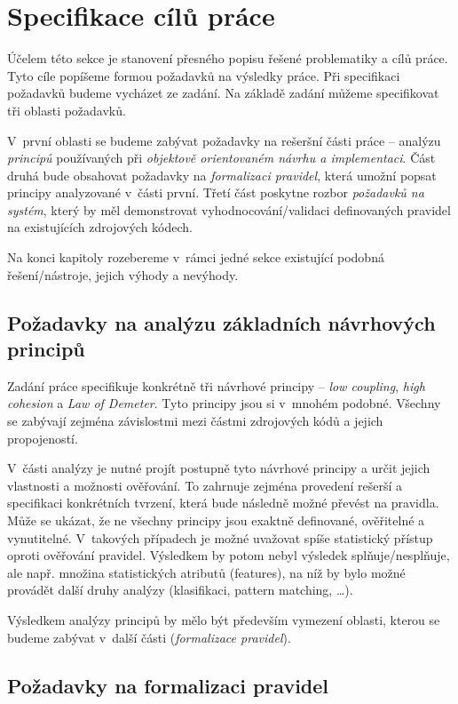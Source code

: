 \chapter{Specifikace cílů práce}

Účelem této sekce je stanovení přesného popisu řešené problematiky a cílů práce. Tyto cíle popíšeme formou požadavků na výsledky práce. Při specifikaci požadavků budeme vycházet ze zadání. Na základě zadání můžeme specifikovat tři oblasti požadavků.

V~první oblasti se budeme zabývat požadavky na rešeršní části práce -- analýzu \emph{principů} používaných při \emph{objektově orientovaném návrhu a implementaci}. Část druhá bude obsahovat požadavky na \emph{formalizaci pravidel}, která umožní popsat principy analyzované v~části první. Třetí část poskytne rozbor \emph{požadavků na systém}, který by měl demonstrovat vyhodnocování/validaci definovaných pravidel na existujících zdrojových kódech.

Na konci kapitoly rozebereme v~rámci jedné sekce existující podobná řešení/nástroje, jejich výhody a nevýhody.

\section{Požadavky na analýzu základních návrhových principů}
\label{requirements-principle_analysis}
Zadání práce specifikuje konkrétně tři návrhové principy -- \emph{low coupling}, \emph{high cohesion} a \emph{Law of Demeter}. Tyto principy jsou si v~mnohém podobné. Všechny se zabývají zejména závislostmi mezi částmi zdrojových kódů a jejich propojeností.

V~části analýzy je nutné projít postupně tyto návrhové principy a určit jejich vlastnosti a možnosti ověřování. To zahrnuje zejména provedení rešerší a specifikaci konkrétních tvrzení, která bude následně možné převést na pravidla. Může se ukázat, že ne všechny principy jsou exaktně definované, ověřitelné a vynutitelné. V~takových případech je možné uvažovat spíše statistický přístup oproti ověřování pravidel. Výsledkem by potom nebyl výsledek splňuje/nesplňuje, ale např. množina statistických atributů (features), na níž by bylo možné provádět další druhy analýzy (klasifikaci, pattern matching, \ldots).

Výsledkem analýzy principů by mělo být především vymezení oblasti, kterou se budeme zabývat v~další části (\emph{formalizace pravidel}).

\section{Požadavky na formalizaci pravidel}

